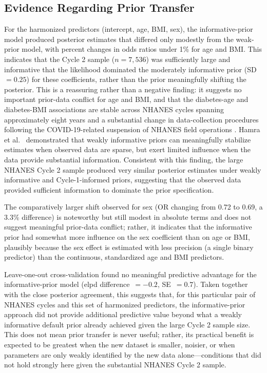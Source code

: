 \documentclass[11pt]{article}
\begin{document}
\subsection{Evidence Regarding Prior Transfer}
For the harmonized predictors (intercept, age, BMI, sex), the
informative-prior model produced posterior estimates that differed only
modestly from the weak-prior model, with percent changes in odds ratios
under 1\% for age and BMI. This indicates that the Cycle 2 sample
($n=7{,}536$) was sufficiently large and informative that the likelihood
dominated the moderately informative prior (SD~$=0.25$) for these
coefficients, rather than the prior meaningfully shifting the posterior.
This is a reassuring rather than a negative finding: it suggests no
important prior-data conflict for age and BMI, and that the diabetes-age and
diabetes-BMI associations are stable across NHANES cycles spanning
approximately eight years and a substantial change in data-collection
procedures following the COVID-19-related suspension of NHANES field
operations \citep{NCHS2023}.
Hamra et al.~\cite{Hamra2013} demonstrated that weakly informative priors can
meaningfully stabilize estimates when observed data are sparse, but exert
limited influence when the data provide substantial information. Consistent
with this finding, the large NHANES Cycle 2 sample produced very similar
posterior estimates under weakly informative and Cycle-1-informed priors,
suggesting that the observed data provided sufficient information to
dominate the prior specification.\cite{Hamra2013}

The comparatively larger shift observed for sex (OR changing from 0.72 to
0.69, a 3.3\% difference) is noteworthy but still modest in absolute terms
and does not suggest meaningful prior-data conflict; rather, it indicates
that the informative prior had somewhat more influence on the sex
coefficient than on age or BMI, plausibly because the sex effect is
estimated with less precision (a single binary predictor) than the
continuous, standardized age and BMI predictors.

Leave-one-out cross-validation found no meaningful predictive advantage for
the informative-prior model (elpd difference~$=-0.2$, SE~$=0.7$). Taken
together with the close posterior agreement, this suggests that, for this
particular pair of NHANES cycles and this set of harmonized predictors, the
informative-prior approach did not provide additional predictive value
beyond what a weakly informative default prior already achieved given the
large Cycle 2 sample size. This does not mean prior transfer is never
useful; rather, its practical benefit is expected to be greatest when the
new dataset is smaller, noisier, or when parameters are only weakly
identified by the new data alone---conditions that did not hold strongly
here given the substantial NHANES Cycle 2 sample.
\end{document}
